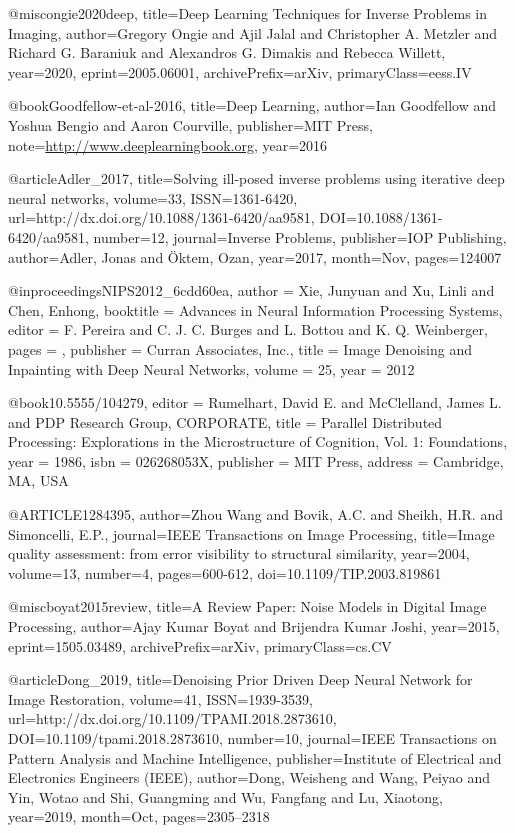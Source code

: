 @misc{ongie2020deep,
      title={Deep Learning Techniques for Inverse Problems in Imaging}, 
      author={Gregory Ongie and Ajil Jalal and Christopher A. Metzler and Richard G. Baraniuk and Alexandros G. Dimakis and Rebecca Willett},
      year={2020},
      eprint={2005.06001},
      archivePrefix={arXiv},
      primaryClass={eess.IV}
}

@book{Goodfellow-et-al-2016,
    title={Deep Learning},
    author={Ian Goodfellow and Yoshua Bengio and Aaron Courville},
    publisher={MIT Press},
    note={\url{http://www.deeplearningbook.org}},
    year={2016}
}

@article{Adler_2017,
	title={Solving ill-posed inverse problems using iterative deep neural networks},
	volume={33},
	ISSN={1361-6420},
	url={http://dx.doi.org/10.1088/1361-6420/aa9581},
	DOI={10.1088/1361-6420/aa9581},
	number={12},
	journal={Inverse Problems},
	publisher={IOP Publishing},
	author={Adler, Jonas and Öktem, Ozan},
	year={2017},
	month={Nov},
	pages={124007}
}

@inproceedings{NIPS2012_6cdd60ea,
	author = {Xie, Junyuan and Xu, Linli and Chen, Enhong},
	booktitle = {Advances in Neural Information Processing Systems},
	editor = {F. Pereira and C. J. C. Burges and L. Bottou and K. Q. Weinberger},
	pages = {},
	publisher = {Curran Associates, Inc.},
	title = {Image Denoising and Inpainting with Deep Neural Networks},
	volume = {25},
	year = {2012}
}

@book{10.5555/104279,
	editor = {Rumelhart, David E. and McClelland, James L. and PDP Research Group, CORPORATE},
	title = {Parallel Distributed Processing: Explorations in the Microstructure of Cognition, Vol. 1: Foundations},
	year = {1986},
	isbn = {026268053X},
	publisher = {MIT Press},
	address = {Cambridge, MA, USA}
}

@ARTICLE{1284395,
	author={Zhou Wang and Bovik, A.C. and Sheikh, H.R. and Simoncelli, E.P.},
	journal={IEEE Transactions on Image Processing}, 
	title={Image quality assessment: from error visibility to structural similarity}, 
	year={2004},
	volume={13},
	number={4},
	pages={600-612},
	doi={10.1109/TIP.2003.819861}}

@misc{boyat2015review,
	title={A Review Paper: Noise Models in Digital Image Processing}, 
	author={Ajay Kumar Boyat and Brijendra Kumar Joshi},
	year={2015},
	eprint={1505.03489},
	archivePrefix={arXiv},
	primaryClass={cs.CV}
}

@article{Dong_2019,
	title={Denoising Prior Driven Deep Neural Network for Image Restoration},
	volume={41},
	ISSN={1939-3539},
	url={http://dx.doi.org/10.1109/TPAMI.2018.2873610},
	DOI={10.1109/tpami.2018.2873610},
	number={10},
	journal={IEEE Transactions on Pattern Analysis and Machine Intelligence},
	publisher={Institute of Electrical and Electronics Engineers (IEEE)},
	author={Dong, Weisheng and Wang, Peiyao and Yin, Wotao and Shi, Guangming and Wu, Fangfang and Lu, Xiaotong},
	year={2019},
	month={Oct},
	pages={2305–2318}
}

